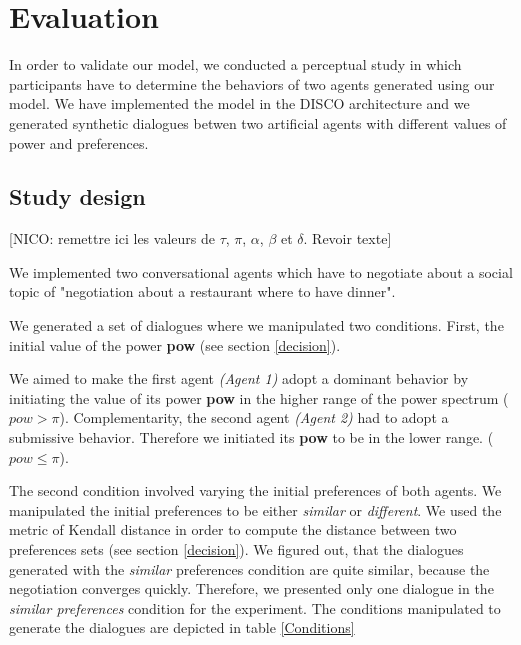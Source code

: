 \documentclass{llncs}
\begin{document}
	\section{Evaluation}
	\label{sec:expe}
		
	In order to validate our model, we conducted a perceptual study in which participants have to determine the behaviors of two agents generated using our model. We have implemented the model in the DISCO \cite{rich} architecture and we generated synthetic dialogues betwen two artificial agents with different values of power and preferences.
	
	\subsection{Study design}
	[NICO: remettre ici les valeurs de $\tau$, $\pi$, $\alpha$, $\beta$ et $\delta$. Revoir texte]
	
	We implemented two conversational agents which have to negotiate about a social topic of "negotiation about a restaurant where to have dinner".
	
	We generated a set of dialogues where we manipulated two conditions. First, the initial value of the power \textbf{pow} (see section \ref{decision}). 
	
	We aimed to make the first agent \emph{(Agent 1)} adopt a dominant behavior by initiating the value of its power \textbf{pow} in the higher range of the power spectrum ($pow>\pi$). Complementarity, the second agent \emph{(Agent 2)} had to adopt a submissive behavior. Therefore we initiated its \textbf{pow} to be in the lower range. ($ pow\leq \pi$).
	
	
	The second condition involved varying the initial preferences of both agents. We manipulated the initial preferences to be either \textit{similar} or \textit{different}. We used the metric of Kendall distance \cite{bra2013Kendall} in order to compute the distance between two preferences sets (see section \ref{decision}).  
	We figured out, that the dialogues generated with the \textit{similar} preferences condition are quite similar, because the negotiation converges quickly. Therefore, we presented only one dialogue in the \textit{similar preferences} condition for the experiment. 
	The conditions manipulated to generate the dialogues are depicted in table \ref{Conditions}
	
\end{document}
